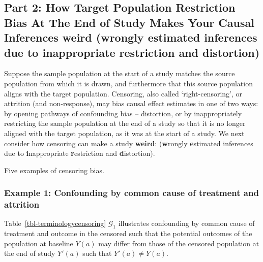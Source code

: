 \documentclass[
  single column]{article}
\begin{document}
\subsection{\texorpdfstring{Part 2: How Target Population Restriction
Bias At The End of Study Makes Your Causal Inferences weird
(\textbf{w}rongly \textbf{e}stimated inferences due to
\textbf{i}nappropriate \textbf{r}estriction and
\textbf{d}istortion)}{Part 2: How Target Population Restriction Bias At The End of Study Makes Your Causal Inferences weird (wrongly estimated inferences due to inappropriate restriction and distortion)}}\label{id-sec-2}

Suppose the sample population at the start of a study matches the source
population from which it is drawn, and furthermore that this source
population aligns with the target population. Censoring, also called
`right-censoring', or attrition (and non-response), may bias causal
effect estimates in one of two ways: by opening pathways of confounding
bias -- distortion, or by inappropriately restricting the sample
population at the end of a study so that it is no longer aligned with
the target population, as it was at the start of a study. We next
consider how censoring can make a study \textbf{weird}:
(\textbf{w}rongly \textbf{e}stimated inferences due to
\textbf{i}nappropriate \textbf{r}estriction and \textbf{d}istortion).

\begin{table}

\caption{\label{tbl-terminologycensoring}Five examples of censoring
bias.}

\centering{

\terminologycensoring

}

\end{table}%

\subsubsection{Example 1: Confounding by common cause of treatment and
attrition}\label{example-1-confounding-by-common-cause-of-treatment-and-attrition}

Table~\ref{tbl-terminologycensoring} \(\mathcal{G}_1\) illustrates
confounding by common cause of treatment and outcome in the censored
such that the potential outcomes of the population at baseline \(Y(a)\)
may differ from those of the censored population at the end of study
\(Y'(a)\) such that \(Y'(a) \neq Y(a)\).
\end{document}
